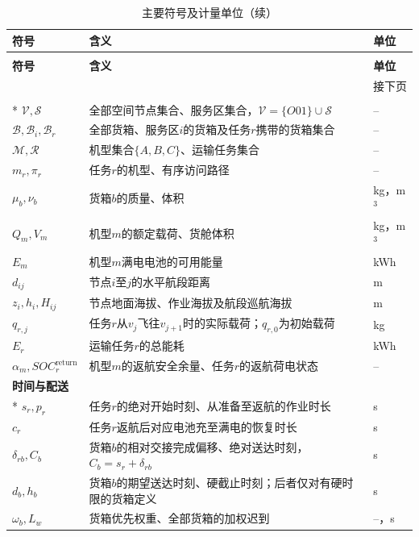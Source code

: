 \documentclass[withoutpreface,colorprint]{format}
\numberwithin{equation}{section}
\numberwithin{figure}{section}
\numberwithin{table}{section}
\begin{document}
\begingroup
\begin{longtable}{@{}p{3.0cm}p{\dimexpr\textwidth-4.8cm-4\tabcolsep\relax}p{1.8cm}@{}}
\caption{主要符号及计量单位}\label{tab:main_symbols}\\
\toprule
\textbf{符号} & \textbf{含义} & \textbf{单位}\\
\midrule
\endfirsthead
\caption[]{主要符号及计量单位（续）}\\
\toprule
\textbf{符号} & \textbf{含义} & \textbf{单位}\\
\midrule
\endhead
\midrule
\multicolumn{3}{r}{\small 接下页}\\
\endfoot
\bottomrule
\endlastfoot
\multicolumn{3}{l}{\textbf{对象与物理量}}\\*
$\mathcal V,\mathcal S$ & 全部空间节点集合、服务区集合，$\mathcal V=\{O01\}\cup\mathcal S$ & --\\
$\mathcal B,\mathcal B_i,\mathcal B_r$ & 全部货箱、服务区$i$的货箱及任务$r$携带的货箱集合 & --\\
$\mathcal M,\mathcal R$ & 机型集合$\{A,B,C\}$、运输任务集合 & --\\
$m_r,\pi_r$ & 任务$r$的机型、有序访问路径 & --\\
$\mu_b,\nu_b$ & 货箱$b$的质量、体积 & kg，m$^3$\\
$Q_m,V_m$ & 机型$m$的额定载荷、货舱体积 & kg，m$^3$\\
$E_m$ & 机型$m$满电电池的可用能量 & kWh\\
$d_{ij}$ & 节点$i$至$j$的水平航段距离 & m\\
$z_i,h_i,H_{ij}$ & 节点地面海拔、作业海拔及航段巡航海拔 & m\\
$q_{r,j}$ & 任务$r$从$v_j$飞往$v_{j+1}$时的实际载荷；$q_{r,0}$为初始载荷 & kg\\
$E_r$ & 运输任务$r$的总能耗 & kWh\\
$\alpha_m,SOC_r^{\mathrm{return}}$ & 机型$m$的返航安全余量、任务$r$的返航荷电状态 & --\\
\midrule
\multicolumn{3}{l}{\textbf{时间与配送}}\\*
$s_r,p_r$ & 任务$r$的绝对开始时刻、从准备至返航的作业时长 & s\\
$c_r$ & 任务$r$返航后对应电池充至满电的恢复时长 & s\\
$\delta_{rb},C_b$ & 货箱$b$的相对交接完成偏移、绝对送达时刻，$C_b=s_r+\delta_{rb}$ & s\\
$d_b,h_b$ & 货箱$b$的期望送达时刻、硬截止时刻；后者仅对有硬时限的货箱定义 & s\\
$\omega_b,L_w$ & 货箱优先权重、全部货箱的加权迟到 & --，s\\

\end{longtable}
\end{document}
